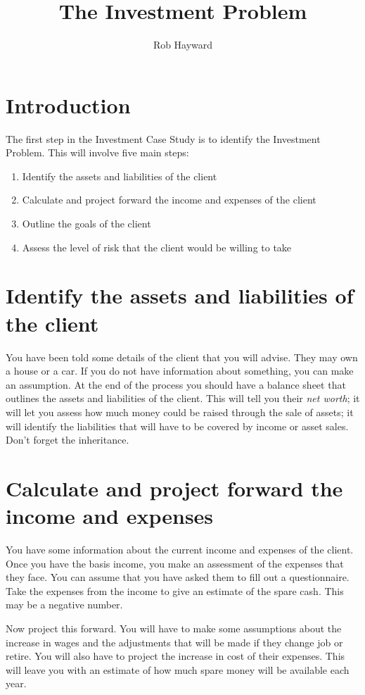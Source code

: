 \documentclass[12pt, a4paper, oneside]{article}\usepackage{graphicx, color}
\begin{document}
\title{The Investment Problem}
\author{Rob Hayward}
\maketitle
\section{Introduction}
The first step in the Investment Case Study is to identify the Investment Problem. This will involve five main steps:
\begin{enumerate}
\item Identify the assets and liabilities of the client
\item Calculate and project forward the income and expenses of the client
\item Outline the goals of the client
\item Assess the level of risk that the client would be willing to take
\end{enumerate}

\section{Identify the assets and liabilities of the client}
You have been told some details of the client that you will advise.  They may own a house or a car.  If you do not have information about something, you can make an assumption.  At the end of the process you should have a balance sheet that outlines the assets and liabilities of the client.  This will tell you their \emph{net worth}; it will let you assess how much money could be raised through the sale of assets; it will identify the liabilities that will have to be covered by income or asset sales.  Don't forget the inheritance. 

\section{Calculate and project forward the income and expenses}
You have some information about the current income and expenses of the client. Once you have the basis income, you make an assessment of the expenses that they face.  You can assume that you have asked them to fill out a questionnaire. Take the expenses from the income to give an estimate of the spare cash.  This may be a negative number.  

Now project this forward.  You will have to make some assumptions about the increase in wages and the adjustments that will be made if they change job or retire.  You will also have to project the increase in cost of their expenses. This will leave you with an estimate of how much spare money will be available each year. 
\end{document}
